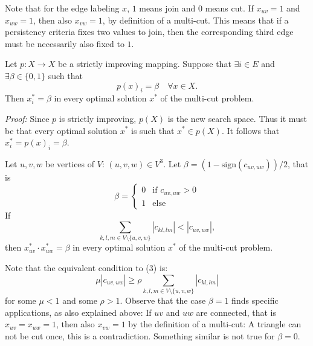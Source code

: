 Note that for the edge labeling $x$, $1$ means join and $0$ means cut. If $x_{uv}=1$ and $x_{uw}=1$, then also $x_{vw}=1$, by definition of a multi-cut. This means that if a persistency criteria fixes two values to join, then the corresponding third edge must be necessarily also fixed to $1$. 
\begin{lemma}
Let $p: X \to X$ be a strictly improving mapping. Suppose that $\exists i \in E$ and $ \exists \beta \in \{0,1\}$ such that \[ p(x)_i = \beta \quad \forall x \in X. \] Then $x^*_i=\beta$ in every optimal solution $x^*$ of the multi-cut problem. 
\end{lemma}
\textit{Proof:} Since $p$ is strictly improving, $p(X)$ is the new search space. Thus it must be that every optimal solution $x^*$ is such that $x^* \in p(X)$. It follows that $x^*_i =p(x)_i=\beta$.  
\begin{theorem}
Let $u,v,w$ be vertices of $V$: $(u,v,w) \in V^3$. 
Let $\beta=(1-\text{sign}(c_{uv,uw}))/2$, that is 
\begin{equation*} \beta= \begin{cases}
0 & \text{if } c_{uv,uw} >0 \\
1 & \text{else}
\end{cases} \end{equation*}
If \begin{equation}
 \sum_{k,l,m \in V \setminus \{ u,v,w\} } |c_{kl,lm}|  < |c_{uv,uw}|, 
\end{equation}
 then $x^*_{uv} \cdot x^*_{uw}=\beta$ in every optimal solution $x^*$ of the multi-cut problem. 
\end{theorem}
Note that the equivalent condition to (3) is: 
\begin{equation}
    \mu |c_{uv,uw}| \geq \rho \sum_{k,l,m \in V \setminus \{u,v,w\}} |c_{kl,lm}| 
\end{equation}
for some $\mu <1$ and some $\rho >1$. 
Observe that the case $\beta=1$ finds specific applications, as also explained above: If $uv$ and $uw$ are connected, that is $x_{uv}=x_{uw}=1$, then also $x_{vw}=1$ by the definition of a multi-cut: A triangle can not be cut once, this is a contradiction. Something similar is not true for $\beta=0$. 

 

